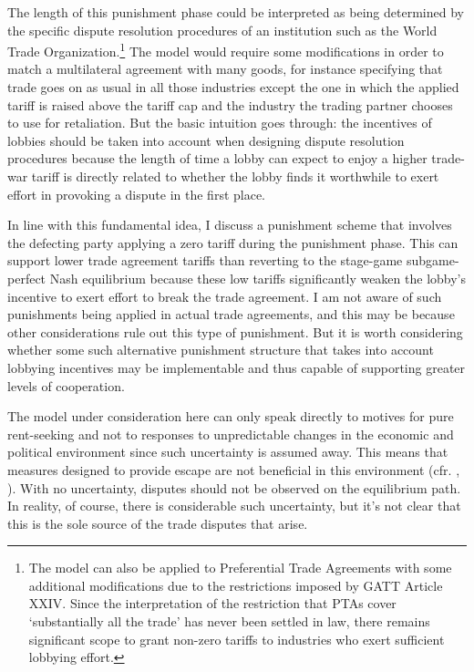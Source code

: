 \documentclass[authoryear, review]{elsarticle}
\begin{document}
The length of this punishment phase could be interpreted as being determined by the specific dispute resolution procedures of an institution such as the World Trade Organization.\footnote{The model can also be applied to Preferential Trade Agreements with some additional modifications due to the restrictions imposed by GATT Article XXIV. Since the interpretation of the restriction that PTAs cover `substantially all the trade' has never been settled in law, there remains significant scope to grant non-zero tariffs to industries who exert sufficient lobbying effort.} The model would require some modifications in order to match a multilateral agreement with many goods, for instance specifying that trade goes on as usual in all those industries except the one in which the applied tariff is raised above the tariff cap and the industry the trading partner chooses to use for retaliation. But the basic intuition goes through: the incentives of lobbies should be taken into account when designing dispute resolution procedures because the length of time a lobby can expect to enjoy a higher trade-war tariff is directly related to whether the lobby finds it worthwhile to exert effort in provoking a dispute in the first place. 

In line with this fundamental idea, I discuss a punishment scheme that involves the defecting party applying a zero tariff during the punishment phase. This can support lower trade agreement tariffs than reverting to the stage-game subgame-perfect Nash equilibrium because these low tariffs significantly weaken the lobby's incentive to exert effort to break the trade agreement. I am not aware of such punishments being applied in actual trade agreements, and this may be because other considerations rule out this type of punishment. But it is worth considering whether some such alternative punishment structure that takes into account lobbying incentives may be implementable and thus capable of supporting greater levels of cooperation.

The model under consideration here can only speak directly to motives for pure rent-seeking and not to responses to unpredictable changes in the economic and political environment since such uncertainty is assumed away. This means that measures designed to provide escape are not beneficial in this environment (cfr. \citet{bs2005}, \citet{buzard2014}). With no uncertainty, disputes should not be observed on the equilibrium path. In reality, of course, there is considerable such uncertainty, but it's not clear that this is the sole source of the trade disputes that arise.
\end{document}
